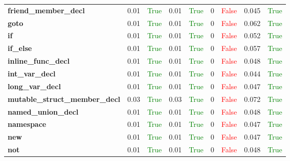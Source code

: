 \documentclass{article}
\begin{document}
\begin{xltabular}{\textwidth}{lcccccccc}
\textbf{{\fontsize{10}{12}\selectfont friend\_member\_decl}}& 0.01&\textcolor{green}{True}& 0.01&\textcolor{green}{True}& 0&\textcolor{red}{False}& 0.045&\textcolor{green}{True} \\[0.5ex]
\textbf{{\fontsize{10}{12}\selectfont goto}}& 0.01&\textcolor{green}{True}& 0.01&\textcolor{green}{True}& 0&\textcolor{red}{False}& 0.062&\textcolor{green}{True} \\[0.5ex]
\textbf{{\fontsize{10}{12}\selectfont if}}& 0.01&\textcolor{green}{True}& 0.01&\textcolor{green}{True}& 0&\textcolor{red}{False}& 0.052&\textcolor{green}{True} \\[0.5ex]
\textbf{{\fontsize{10}{12}\selectfont if\_else}}& 0.01&\textcolor{green}{True}& 0.01&\textcolor{green}{True}& 0&\textcolor{red}{False}& 0.057&\textcolor{green}{True} \\[0.5ex]
\textbf{{\fontsize{10}{12}\selectfont inline\_func\_decl}}& 0.01&\textcolor{green}{True}& 0.01&\textcolor{green}{True}& 0&\textcolor{red}{False}& 0.048&\textcolor{green}{True} \\[0.5ex]
\textbf{{\fontsize{10}{12}\selectfont int\_var\_decl}}& 0.01&\textcolor{green}{True}& 0.01&\textcolor{green}{True}& 0&\textcolor{red}{False}& 0.044&\textcolor{green}{True} \\[0.5ex]
\textbf{{\fontsize{10}{12}\selectfont long\_var\_decl}}& 0.01&\textcolor{green}{True}& 0.01&\textcolor{green}{True}& 0&\textcolor{red}{False}& 0.047&\textcolor{green}{True} \\[0.5ex]
\textbf{{\fontsize{10}{12}\selectfont mutable\_struct\_member\_decl}}& 0.03&\textcolor{green}{True}& 0.03&\textcolor{green}{True}& 0&\textcolor{red}{False}& 0.072&\textcolor{green}{True} \\[0.5ex]
\textbf{{\fontsize{10}{12}\selectfont named\_union\_decl}}& 0.01&\textcolor{green}{True}& 0.01&\textcolor{green}{True}& 0&\textcolor{red}{False}& 0.048&\textcolor{green}{True} \\[0.5ex]
\textbf{{\fontsize{10}{12}\selectfont namespace}}& 0.01&\textcolor{green}{True}& 0.01&\textcolor{green}{True}& 0&\textcolor{red}{False}& 0.047&\textcolor{green}{True} \\[0.5ex]
\textbf{{\fontsize{10}{12}\selectfont new}}& 0.01&\textcolor{green}{True}& 0.01&\textcolor{green}{True}& 0&\textcolor{red}{False}& 0.047&\textcolor{green}{True} \\[0.5ex]
\textbf{{\fontsize{10}{12}\selectfont not}}& 0.01&\textcolor{green}{True}& 0.01&\textcolor{green}{True}& 0&\textcolor{red}{False}& 0.048&\textcolor{green}{True} \\[0.5ex]

\end{xltabular}
\end{document}

